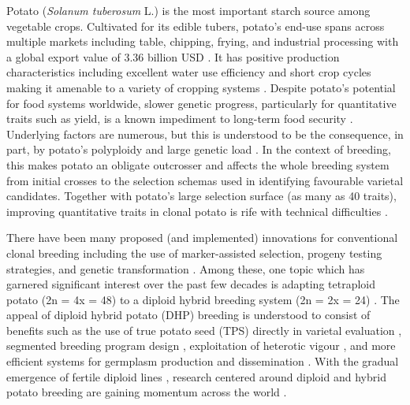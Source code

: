 \begin{refsection}
Potato (\textit{Solanum tuberosum} L.) is the most important starch source among vegetable crops. Cultivated for its edible tubers, potato's end-use spans across multiple markets including table, chipping, frying, and industrial processing with a global export value of 3.36 billion USD \parencite{FAO.STAT2023}. It has positive production characteristics including excellent water use efficiency and short crop cycles making it amenable to a variety of cropping systems \parencite{Haverkort1990}. Despite potato's potential for food systems worldwide, slower genetic progress, particularly for quantitative traits such as yield, is a known impediment to long-term food security \parencite{Douches1996}. Underlying factors are numerous, but this is understood to be the consequence, in part, by potato's polyploidy and large genetic load \parencite{Lian2019}. In the context of breeding, this makes potato an obligate outcrosser and affects the whole breeding system from initial crosses to the selection schemas used in identifying favourable varietal candidates. Together with potato's large selection surface (as many as 40 traits), improving quantitative traits in clonal potato is rife with technical difficulties \parencite{Gebhardt2013, Gopal2015}.  

There have been many proposed (and implemented) innovations for conventional clonal breeding including the use of marker-assisted selection, progeny testing strategies, and genetic transformation  \parencite{Bradshaw2022}. Among these, one topic which has garnered significant interest over the past few decades is adapting tetraploid potato (2n = 4x = 48) to a diploid hybrid breeding system (2n = 2x = 24) \parencite{Lindhout2011, Jansky2016}. The appeal of diploid hybrid potato (DHP) breeding is understood to consist of benefits such as the use of true potato seed (TPS) directly in varietal evaluation \parencite{VanDijk2021}, segmented breeding program design \parencite{Technow2021}, exploitation of heterotic vigour \parencite{Technow2012}, and more efficient systems for germplasm production and dissemination \parencite{Pallais1991}. With the gradual emergence of fertile diploid lines \parencite{Eggers2021, Ma2021}, research centered around diploid and hybrid potato breeding are gaining momentum across the world \parencite{Lindhout2018, Bethke2022, Jansky2016, Zhang2021}. 


\end{refsection}
